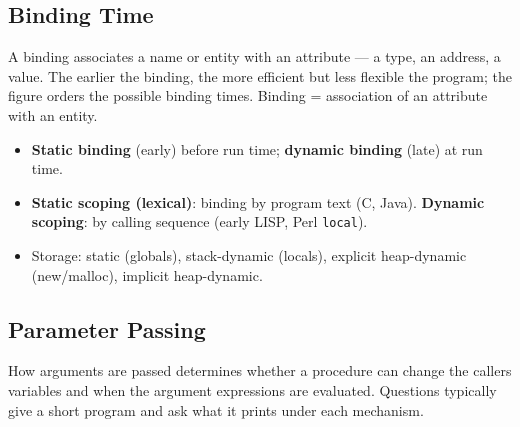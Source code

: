 \endgroup

\needspace{125pt}

\hypertarget{p2-03--12-binding-time}{%
\subsection{Binding Time}\label{p2-03--12-binding-time}}

A binding associates a name or entity with an attribute --- a type, an address, a value. The earlier the
binding, the more efficient but less flexible the program; the figure orders the possible binding times.
Binding = association of an attribute with an entity.



\begin{itemize}
\tightlist
\item
  \textbf{Static binding} (early) before run time; \textbf{dynamic binding} (late) at run time.
\item
  \textbf{Static scoping (lexical)}: binding by program text (C, Java). \textbf{Dynamic scoping}: by calling sequence (early LISP, Perl \texttt{local}).
\item
  Storage: static (globals), stack-dynamic (locals), explicit heap-dynamic (new/malloc), implicit heap-dynamic.
\end{itemize}

\needspace{160pt}

\hypertarget{p2-03--13-parameter-passing}{%
\subsection{Parameter Passing}\label{p2-03--13-parameter-passing}}

How arguments are passed determines whether a procedure can change the caller\textquotesingle s variables and when the
argument expressions are evaluated. Questions typically give a short program and ask what it prints under
each mechanism.

\begingroup\small

